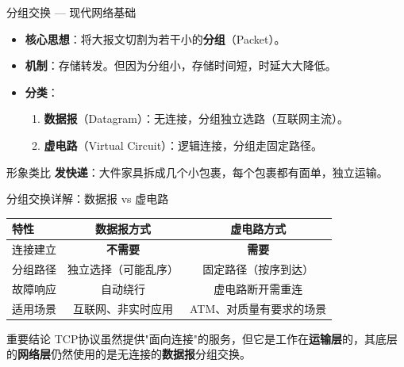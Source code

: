 \documentclass[10pt, aspectratio=169]{beamer}
\begin{document}
\begin{frame}{分组交换 --- 现代网络基础}
    \begin{itemize}
        \item \textbf{核心思想}：将大报文切割为若干小的\textbf{分组}（Packet）。
        \item \textbf{机制}：存储转发。但因为分组小，存储时间短，时延大大降低。
        \item \textbf{分类}：
        \begin{enumerate}
            \item \textbf{数据报}（Datagram）：无连接，分组独立选路（互联网主流）。
            \item \textbf{虚电路}（Virtual Circuit）：逻辑连接，分组走固定路径。
        \end{enumerate}
    \end{itemize}
    \vspace{0.5em}
    \begin{exampleblock}{形象类比}
        \textbf{发快递}：大件家具拆成几个小包裹，每个包裹都有面单，独立运输。
    \end{exampleblock}
\end{frame}

\begin{frame}{分组交换详解：数据报 vs 虚电路}
    \begin{table}
        \small
        \begin{tabular}{|l|c|c|}
            \hline
            \textbf{特性} & \textbf{数据报方式} & \textbf{虚电路方式} \\ \hline
            连接建立 & \textbf{不需要} & \textbf{需要} \\
            分组路径 & 独立选择（可能乱序） & 固定路径（按序到达） \\
            故障响应 & 自动绕行 & 虚电路断开需重连 \\
            适用场景 & 互联网、非实时应用 & ATM、对质量有要求的场景 \\
            \hline
        \end{tabular}
    \end{table}
    \vspace{0.5em}
    \begin{block}{重要结论}
        TCP协议虽然提供"面向连接"的服务，但它是工作在\textbf{运输层}的，其底层的\textbf{网络层}仍然使用的是无连接的\textbf{数据报}分组交换。
    \end{block}
\end{frame}
\end{document}
